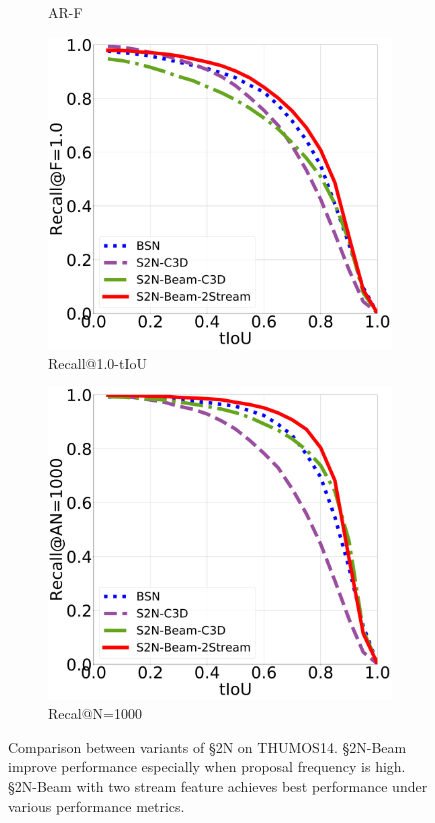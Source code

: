 \documentclass[10pt,journal,compsoc]{IEEEtran}
\begin{document}
\begin{figure}[t]
\begin{subfigure}[b]{0.24\textwidth}
        \caption{AR-F}
   \end{subfigure}  
       \begin{subfigure}[b]{0.24\textwidth}
   	\includegraphics[width=\textwidth]{figures/results/S2N-Beam-2Stream_recall_freq.pdf}
    \caption{Recall@1.0-tIoU}
       \end{subfigure}  
        \begin{subfigure}[b]{0.24\textwidth}
    	\includegraphics[width=\textwidth]{figures/results/S2N-Beam-2Stream_recall1000.pdf}
	\caption{Recal@N=1000\label{subfig:avg-recall-comp}}
    \end{subfigure}

   \caption{Comparison between variants of \S2N on THUMOS14. \S2N-Beam improve performance especially when proposal frequency is high. \S2N-Beam with two stream feature achieves best performance under various performance metrics. \label{fig:proposal-2stream}}   
\vspace{-.05in}
\end{figure}
\end{document}
